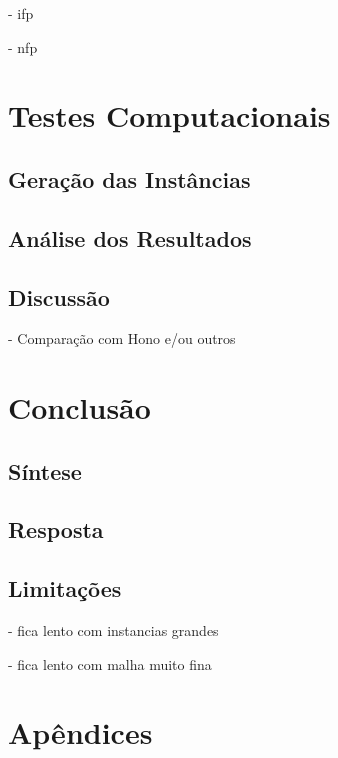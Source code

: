 \documentclass[a4paper, 12pt]{article}
\begin{document}
- ifp

- nfp

\section{Testes Computacionais}
\label{sec:testes}

\subsection{Geração das Instâncias}
\label{sub:instancias}

\subsection{Análise dos Resultados}

\subsection{Discussão}

- Comparação com Hono e/ou outros

\section{Conclusão}
\label{sec:conclusoes}

\subsection{Síntese}

\subsection{Resposta}

\subsection{Limitações}
\label{sub:limitacoes}

- fica lento com instancias grandes

- fica lento com malha muito fina

\newpage
\printbibliography[title={Referências Bibliográficas}]

\section{Apêndices}
\label{sec:agradecimentos}
\end{document}
